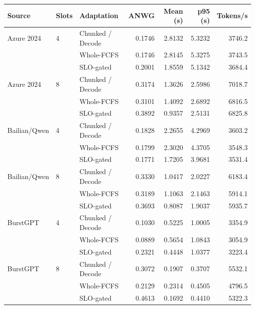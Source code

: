 \begin{tabular}{ll l rrrr}
\toprule
Source & Slots & Adaptation & ANWG & Mean (s) & p95 (s) & Tokens/s \\
\midrule
Azure 2024 & 4 & Chunked / Decode & 0.1746 & 2.8132 & 5.3232 & 3746.2 \\
 &  & Whole-FCFS & 0.1746 & 2.8145 & 5.3275 & 3743.5 \\
 &  & SLO-gated & 0.2001 & 1.8559 & 5.1342 & 3684.4 \\
Azure 2024 & 8 & Chunked / Decode & 0.3174 & 1.3626 & 2.5986 & 7018.7 \\
 &  & Whole-FCFS & 0.3101 & 1.4092 & 2.6892 & 6816.5 \\
 &  & SLO-gated & 0.3892 & 0.9357 & 2.5131 & 6825.8 \\
Bailian/Qwen & 4 & Chunked / Decode & 0.1828 & 2.2655 & 4.2969 & 3603.2 \\
 &  & Whole-FCFS & 0.1799 & 2.3020 & 4.3705 & 3548.3 \\
 &  & SLO-gated & 0.1771 & 1.7205 & 3.9681 & 3531.4 \\
Bailian/Qwen & 8 & Chunked / Decode & 0.3330 & 1.0417 & 2.0227 & 6183.4 \\
 &  & Whole-FCFS & 0.3189 & 1.1063 & 2.1463 & 5914.1 \\
 &  & SLO-gated & 0.3693 & 0.8087 & 1.9037 & 5935.7 \\
BurstGPT & 4 & Chunked / Decode & 0.1030 & 0.5225 & 1.0005 & 3354.9 \\
 &  & Whole-FCFS & 0.0889 & 0.5654 & 1.0843 & 3054.9 \\
 &  & SLO-gated & 0.2321 & 0.4448 & 1.0377 & 3223.4 \\
BurstGPT & 8 & Chunked / Decode & 0.3072 & 0.1907 & 0.3707 & 5532.1 \\
 &  & Whole-FCFS & 0.2129 & 0.2314 & 0.4505 & 4796.5 \\
 &  & SLO-gated & 0.4613 & 0.1692 & 0.4410 & 5322.3 \\
\bottomrule
\end{tabular}

